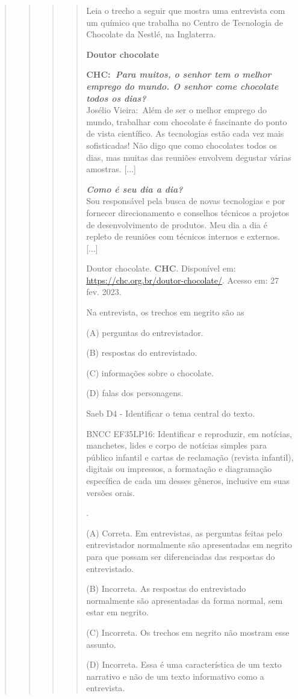 \begin{quote}
\begin{quote}
\begin{quote}
\begin{quote}
Leia o trecho a seguir que mostra uma entrevista com um químico que
trabalha no Centro de Tecnologia de Chocolate da Nestlé, na Inglaterra.

\textbf{Doutor chocolate}

\textbf{CHC:\emph{~Para muitos, o senhor tem o melhor emprego do mundo.
O senhor come chocolate todos os dias?}}\\
Josélio Vieira:~Além de ser o melhor emprego do mundo, trabalhar com
chocolate é fascinante do ponto de vista científico. As tecnologias
estão cada vez mais sofisticadas! Não digo que como chocolates todos os
dias, mas muitas das reuniões envolvem degustar várias amostras.
{[}...{]}

\emph{\textbf{Como é seu dia a dia?}}\\
Sou responsável pela busca de novas tecnologias e por fornecer
direcionamento e conselhos técnicos a projetos de desenvolvimento de
produtos. Meu dia a dia é repleto de reuniões com técnicos internos e
externos. {[}...{]}

Doutor chocolate. \textbf{CHC}. Disponível em:
\url{https://chc.org.br/doutor-chocolate/}. Acesso em: 27 fev. 2023.

Na entrevista, os trechos em negrito são as

(A) perguntas do entrevistador.

(B) respostas do entrevistado.

(C) informações sobre o chocolate.

(D) falas dos personagens.

Saeb D4 - Identificar o tema central do texto.

BNCC EF35LP16: Identificar e reproduzir, em notícias, manchetes, lides e
corpo de notícias simples para público infantil e cartas de reclamação
(revista infantil), digitais ou impressos, a formatação e diagramação
específica de cada um desses gêneros, inclusive em suas versões orais.

.

(A) Correta. Em entrevistas, as perguntas feitas pelo entrevistador
normalmente são apresentadas em negrito para que possam ser
diferenciadas das respostas do entrevistado.

(B) Incorreta. As respostas do entrevistado normalmente são apresentadas
da forma normal, sem estar em negrito.

(C) Incorreta. Os trechos em negrito não mostram esse assunto.

(D) Incorreta. Essa é uma característica de um texto narrativo e não de
um texto informativo como a entrevista.
\end{quote}


\end{quote}
\end{quote}
\end{quote}
